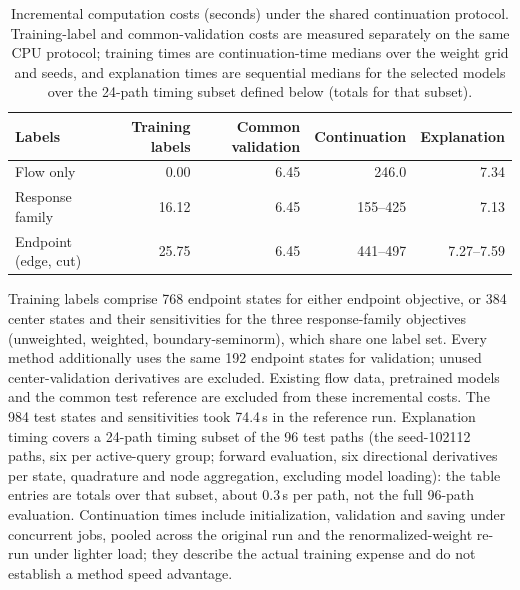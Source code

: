 \begin{table}[t]\centering\footnotesize
\caption{Incremental computation costs (seconds) under the shared
continuation protocol. Training-label and common-validation costs are
measured separately on the same CPU protocol; training times are
continuation-time medians over the weight grid and seeds, and
explanation times are sequential medians for the selected models over
the 24-path timing subset defined below (totals for that subset).}
\label{tab:learning-costs}
\begin{tabular}{lrrrr}\toprule Labels & Training labels & Common validation & Continuation & Explanation\\\midrule
Flow only & 0.00 & 6.45 & 246.0 & 7.34\\
Response family & 16.12 & 6.45 & 155--425 & 7.13\\
Endpoint (edge, cut) & 25.75 & 6.45 & 441--497 & 7.27--7.59\\
\bottomrule\end{tabular}\end{table}
Training labels comprise 768 endpoint states for either endpoint
objective, or 384 center states and their sensitivities for the three
response-family objectives (unweighted, weighted, boundary-seminorm),
which share one label set. Every method additionally uses the same 192
endpoint states for validation; unused center-validation derivatives
are excluded. Existing flow data, pretrained models and the common test
reference are excluded from these incremental costs. The 984 test
states and sensitivities took 74.4\,s in the reference run.
Explanation timing covers a 24-path timing subset of the 96 test paths
(the seed-102112 paths, six per active-query group; forward
evaluation, six directional derivatives per state, quadrature and node
aggregation, excluding model loading): the table entries are totals
over that subset, about $0.3$\,s per path, not the full 96-path
evaluation. Continuation times include
initialization, validation and saving under concurrent jobs, pooled
across the original run and the renormalized-weight re-run under
lighter load; they describe the actual training expense and do not
establish a method speed advantage.

